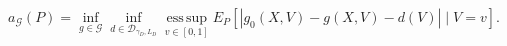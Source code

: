 \[
 a_{\mathcal G}(P)=
 \inf_{g\in\mathcal G}\inf_{d\in\mathcal D_{\gamma_D,L_D}}
 \operatorname*{ess\,sup}_{v\in[0,1]}
 E_P[|g_0(X,V)-g(X,V)-d(V)|\mid V=v].
\]